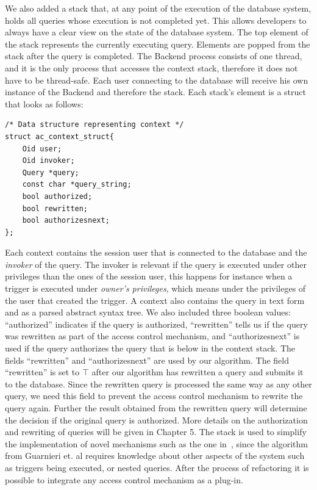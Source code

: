 We also added a stack that, at any point of the execution of the database system, holds all queries whose execution is not completed yet.
%
This allows developers to always have a clear view on the state of the database system.
%
The top element of the stack represents the currently executing query.
%
Elements are popped from the stack after the query is completed.
%
The Backend process consists of one thread, and it is the only process that accesses the context stack, therefore it does not have to be thread-safe.
%
Each user connecting to the database will receive his own instance of the Backend and therefore the stack.
% 
Each stack's element is a struct that looks as follows:
%
\begin{lstlisting}[frame=single, style=customc]
/* Data structure representing context */
struct ac_context_struct{
	Oid user;
	Oid invoker;
	Query *query;
	const char *query_string;
	bool authorized;
	bool rewritten;
	bool authorizesnext;
};
\end{lstlisting}
%
Each context contains the session user that is connected to the database and the \emph{invoker} of the query.
%
The invoker is relevant if the query is executed under other privileges than the ones of the session user, this happens for instance when a trigger is executed under \emph{owner's privileges}, which means under the privileges of the user that created the trigger.
%
A context also contains the query in text form and as a parsed abstract syntax tree.
%
We also included three boolean values: ``authorized'' indicates if the query is authorized, ``rewritten'' tells us if the query was rewritten as part of the access control mechanism, and ``authorizesnext'' is used if the query authorizes the query that is below in the context stack. 
%
The fields ``rewritten'' and ``authorizesnext'' are used by our algorithm.
%
The field ``rewritten'' is set to $\top$ after our algorithm has rewritten a query and submits it to the database. 
%
Since the rewritten query is processed the same way as any other query, we need this field to prevent the access control mechanism to rewrite the query again.
%
Further the result obtained from the rewritten query will determine the decision if the original query is authorized.
%
More details on the authorization and rewriting of queries will be given in Chapter 5.
%
The stack is used to simplify the implementation of novel mechanisms such as the one in~\cite{guarnieri2016strong}, since the algorithm from Guarnieri et. al requires knowledge about other aspects of the system such as triggers being executed, or nested queries.
%
After the process of refactoring it is possible to integrate any access control mechanism as a plug-in.